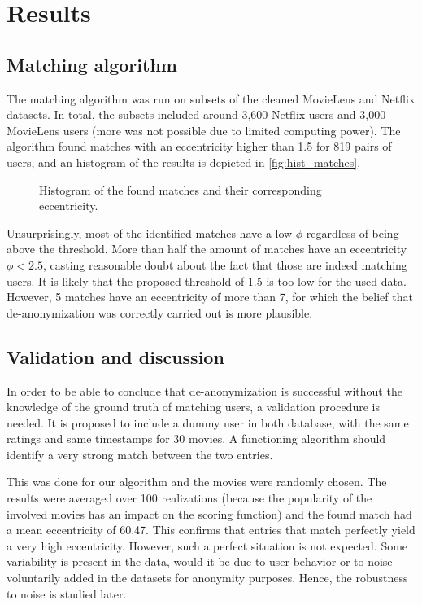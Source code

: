\section{Results}\label{sec:results}

\subsection{Matching algorithm}

The matching algorithm was run on subsets of the cleaned MovieLens and Netflix datasets. In total, the subsets included around 3,600 Netflix users and 3,000 MovieLens users (more was not possible due to limited computing power). The algorithm found matches with an eccentricity higher than 1.5 for 819 pairs of users, and an histogram of the results is depicted in \autoref{fig:hist_matches}.

\begin{figure}[h]
	\centering
	
	\caption{Histogram of the found matches and their corresponding eccentricity.}
	\label{fig:hist_matches}
\end{figure}

Unsurprisingly, most of the identified matches have a low $\phi$ regardless of being above the threshold. More than half the amount of matches have an eccentricity $\phi < 2.5$, casting reasonable doubt about the fact that those are indeed matching users. It is likely that the proposed threshold of 1.5 is too low for the used data. However, 5 matches have an eccentricity of more than 7, for which the belief that de-anonymization was correctly carried out is more plausible.

\subsection{Validation and discussion}

In order to be able to conclude that de-anonymization is successful without the knowledge of the ground truth of matching users, a validation procedure is needed. It is proposed to include a dummy user in both database, with the same ratings and same timestamps for 30 movies. A functioning algorithm should identify a very strong match between the two entries.

This was done for our algorithm and the movies were randomly chosen. The results were averaged over 100 realizations (because the popularity of the involved movies has an impact on the scoring function) and the found match had a mean eccentricity of 60.47. This confirms that entries that match perfectly yield a very high eccentricity. However, such a perfect situation is not expected. Some variability is present in the data, would it be due to user behavior or to noise voluntarily added in the datasets for anonymity purposes. Hence, the robustness to noise is studied later.

